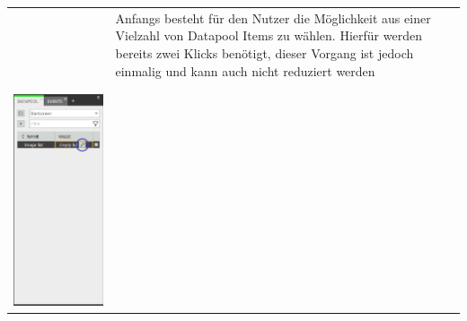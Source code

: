 \begin{longtable}[H] { c | m{5cm} }
\begin{minipage}{.25\textwidth}
    \end{minipage}
    &
   Anfangs besteht für den Nutzer die Möglichkeit aus einer Vielzahl von Datapool Items zu wählen.
  Hierfür werden bereits zwei Klicks benötigt, dieser Vorgang ist jedoch einmalig und kann auch nicht reduziert werden
    \\ 
    \\ \hline
    \\
 \begin{minipage}{.25\textwidth}
      \includegraphics[width=\linewidth]{figures/ImageList_02.PNG}

\end{minipage}
\end{longtable}
